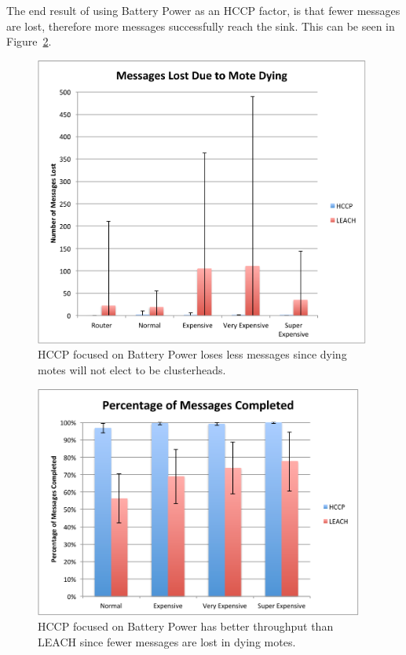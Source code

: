 The end result of using Battery Power as an HCCP factor, is that fewer messages are lost, 
therefore more messages successfully reach the sink. This can be seen in 
Figure~\ref{fig:images_simulation_BatteryVsLeach_Messages}.

\begin{figure}[htbp]
    \centering
        \includegraphics[height=3.75in]{images/simulation/BatteryVsLeach/Death.pdf}
    \caption{HCCP focused on Battery Power loses less messages since dying motes will not elect to be clusterheads.}
    \label{fig:images_simulation_BatteryVsLeach_Death}
\end{figure}

\begin{figure}[htbp]
    \centering
        \includegraphics[height=3in]{images/simulation/BatteryVsLeach/Messages.pdf}
    \caption{HCCP focused on Battery Power has better throughput than LEACH since fewer messages are lost in dying motes.}
    \label{fig:images_simulation_BatteryVsLeach_Messages}
\end{figure}



